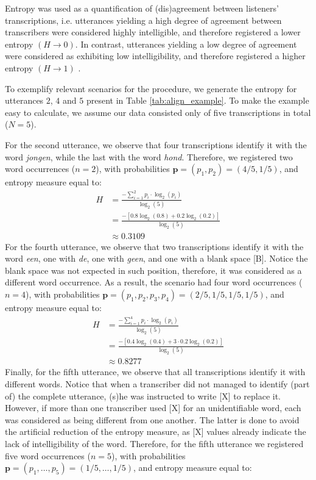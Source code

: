 Entropy was used as a quantification of (dis)agreement between listeners' transcriptions, i.e. utterances yielding a high degree of agreement between transcribers were considered highly intelligible, and therefore registered a lower entropy $\left( H \rightarrow 0 \right)$. In contrast, utterances yielding a low degree of agreement were considered as exhibiting low intelligibility, and therefore registered a higher entropy $\left( H \rightarrow 1 \right)$ \citep{Boonen_et_al_2021, Faes_et_al_2021}. 

To exemplify relevant scenarios for the procedure, we generate the entropy for utterances $2$, $4$ and $5$ present in Table \ref{tab:align_example}. To make the example easy to calculate, we assume our data consisted only of five transcriptions in total ($N=5$).

For the second utterance, we observe that four transcriptions identify it with the word \textit{jongen}, while the last with the word \textit{hond}. Therefore, we registered two word occurrences ($n=2$), with probabilities $\pmb{p} = (p_{1}, p_{2}) = (4/5, 1/5)$, and entropy measure equal to:
%
\begin{align*}
	H &= \frac{-\sum_{i=1}^{2} p_{i} \cdot \log_{2}(p_{i})}{\log_{2}(5)} \\
	&= \frac{- \left[ 0.8 \log_{2}(0.8) + 0.2 \log_{2}(0.2) \right] }{\log_{2}(5)} \\
	&\approx 0.3109
\end{align*} 
%
For the fourth utterance, we observe that two transcriptions identify it with the word \textit{een}, one with \textit{de}, one with \textit{geen}, and one with a blank space [B]. Notice the blank space was not expected in such position, therefore, it was considered as a different word occurrence. As a result, the scenario had four word occurrences ($n=4$), with probabilities $\pmb{p} = (p_{1}, p_{2}, p_{3}, p_{4}) = (2/5, 1/5, 1/5, 1/5)$, and entropy measure equal to:
%
\begin{align*}
	H &= \frac{-\sum_{i=1}^{4} p_{i} \cdot \log_{2}(p_{i})}{\log_{2}(5)} \\
	&= \frac{- \left[ 0.4 \log_{2}(0.4) + 3 \cdot 0.2 \log_{2}(0.2) \right] }{\log_{2}(5)} \\
	&\approx 0.8277
\end{align*} 
%
Finally, for the fifth utterance, we observe that all transcriptions identify it with different words. Notice that when a transcriber did not managed to identify (part of) the complete utterance, (s)he was instructed to write [X]  to replace it. However, if more than one transcriber used [X] for an unidentifiable word, each was considered as being different from one another. The latter is done to avoid the artificial reduction of the entropy measure, as [X] values already indicate the lack of intelligibility of the word. Therefore, for the fifth utterance we registered five word occurrences ($n=5$), with probabilities $\pmb{p} = (p_{1}, \dots, p_{5}) = (1/5, \dots, 1/5)$, and entropy measure equal to:

